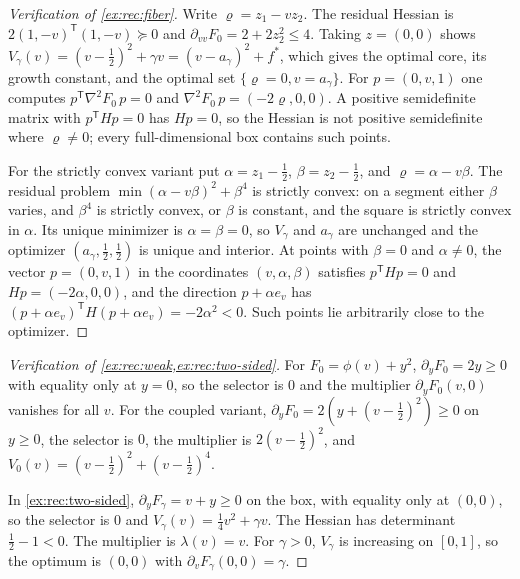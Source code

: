 \begin{proof}[Verification of \cref{ex:rec:fiber}]
Write $\varrho=z_1-vz_2$. The residual Hessian is
$2(1,-v)^{\mathsf T}(1,-v)\succeq0$ and $\partial_{vv}F_0=2+2z_2^2\le4$. Taking
$z=(0,0)$ shows $V_\gamma(v)=(v-\frac12)^2+\gamma v=(v-a_\gamma)^2+f^*$, which
gives the optimal core, its growth constant, and the optimal set
$\{\varrho=0,v=a_\gamma\}$. For $p=(0,v,1)$ one computes
$p^{\mathsf T}\nabla^2F_0\,p=0$ and $\nabla^2F_0\,p=(-2\varrho,0,0)$. A positive
semidefinite matrix with $p^{\mathsf T}Hp=0$ has $Hp=0$, so the Hessian is not
positive semidefinite where $\varrho\ne0$; every full-dimensional box contains
such points.

For the strictly convex variant put $\alpha=z_1-\frac12$, $\beta=z_2-\frac12$, and
$\varrho=\alpha-v\beta$. The residual problem $\min(\alpha-v\beta)^2+\beta^4$ is
strictly convex: on a segment either $\beta$ varies, and $\beta^4$ is strictly
convex, or $\beta$ is constant, and the square is strictly convex in $\alpha$. Its
unique minimizer is $\alpha=\beta=0$, so $V_\gamma$ and $a_\gamma$ are unchanged and
the optimizer $(a_\gamma,\frac12,\frac12)$ is unique and interior. At points
with $\beta=0$ and $\alpha\ne0$, the vector $p=(0,v,1)$ in the coordinates
$(v,\alpha,\beta)$ satisfies $p^{\mathsf T}Hp=0$ and $Hp=(-2\alpha,0,0)$, and the
direction $p+\alpha e_v$ has $(p+\alpha e_v)^{\mathsf T}H(p+\alpha e_v)=-2\alpha^2<0$.
Such points lie arbitrarily close to the optimizer.
\end{proof}

\begin{proof}[Verification of \cref{ex:rec:weak,ex:rec:two-sided}]
For $F_0=\phi(v)+y^2$, $\partial_yF_0=2y\ge0$ with equality only at $y=0$, so the
selector is $0$ and the multiplier $\partial_yF_0(v,0)$ vanishes for all $v$.
For the coupled variant, $\partial_yF_0=2(y+(v-\frac12)^2)\ge0$ on $y\ge0$, the
selector is $0$, the multiplier is $2(v-\frac12)^2$, and
$V_0(v)=(v-\frac12)^2+(v-\frac12)^4$.

In \cref{ex:rec:two-sided}, $\partial_yF_\gamma=v+y\ge0$ on the box, with
equality only at $(0,0)$, so the selector is $0$ and
$V_\gamma(v)=\frac14v^2+\gamma v$. The Hessian has determinant $\frac12-1<0$. The
multiplier is $\lambda(v)=v$. For $\gamma>0$, $V_\gamma$ is increasing on $[0,1]$,
so the optimum is $(0,0)$ with $\partial_vF_\gamma(0,0)=\gamma$.
\end{proof}
